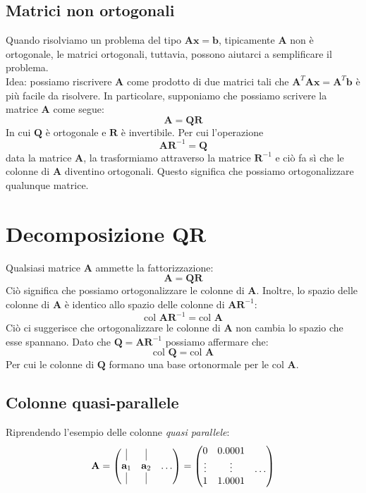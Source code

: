 \documentclass{article}
\begin{document}
        \subsection{Matrici non ortogonali}
            Quando risolviamo un problema del tipo $\mathbf{Ax} = \mathbf{b}$, tipicamente $\mathbf{A}$ non è ortogonale, 
            le matrici ortogonali, tuttavia, possono aiutarci a semplificare il problema. \\
            Idea: possiamo riscrivere $\mathbf{A}$ come prodotto di due matrici tali che $\mathbf{A}^T\mathbf{Ax} = \mathbf{A}^T\mathbf{b}$ 
            è più facile da risolvere. In particolare, supponiamo che possiamo scrivere la matrice $\mathbf{A}$ come segue:
            \[\mathbf{A} = \mathbf{QR}\]
            In cui $\mathbf{Q}$ è ortogonale e $\mathbf{R}$ è invertibile. Per cui l'operazione
            \[\mathbf{AR}^{-1} = \mathbf{Q}\]
            data la matrice $\mathbf{A}$, la trasformiamo attraverso la matrice $\mathbf{R}^{-1}$ e ciò fa sì che le colonne di $\mathbf{A}$
            diventino ortogonali. Questo significa che possiamo ortogonalizzare qualunque matrice.

    \section{Decomposizione QR}
        Qualsiasi matrice $\mathbf{A}$ ammette la fattorizzazione:
        \[\mathbf{A} = \mathbf{QR} \]
        Ciò significa che possiamo ortogonalizzare le colonne di $\mathbf{A}$. Inoltre, lo spazio delle colonne di $\mathbf{A}$ è
        identico allo spazio delle colonne di $\mathbf{AR}^{-1}$:
        \[ \text{col } \mathbf{AR}^{-1} = \text{col } \mathbf{A}\]
        Ciò ci suggerisce che ortogonalizzare le colonne di $\mathbf{A}$ non cambia lo spazio che esse spannano. Dato che $\mathbf{Q}=\mathbf{AR}^{-1}$
        possiamo affermare che:
        \[\text{col }\mathbf{Q} = \text{col }\mathbf{A}\]
        Per cui le colonne di $\mathbf{Q}$ formano una base ortonormale per le $\text{col }\mathbf{A}$.
        
        \subsection{Colonne quasi-parallele}
            Riprendendo l'esempio delle colonne \emph{quasi parallele}:
            \[\mathbf{A} = \begin{pmatrix}
                \vline & \vline & \\
                \mathbf{a}_1 & \mathbf{a}_2 & \dots \\
                \vline & \vline & \\
            \end{pmatrix} = \begin{pmatrix}
                0 & 0.0001 & \\
                \vdots & \vdots & \dots \\
                1 & 1.0001 &
            \end{pmatrix}\]
\end{document}
